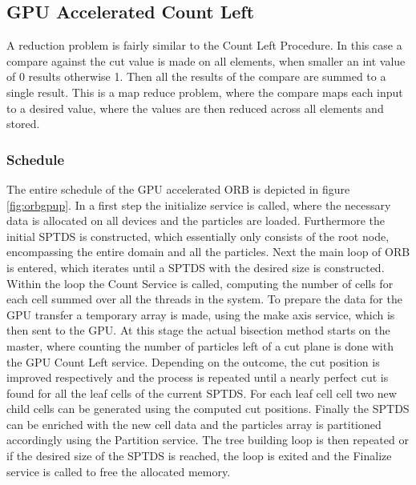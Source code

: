 \documentclass[]{article}
\begin{document}
\subsection{GPU Accelerated Count Left}

A reduction problem is fairly similar to the Count Left Procedure. In this case a compare against the cut value is made on all elements, when smaller an int value of 0 results otherwise 1. Then all the results of the compare are summed to a single result. This is a map reduce problem, where the compare maps each input to a desired value, where the values are then reduced across all elements and stored. 

\subsubsection{Schedule}

The entire schedule of the GPU accelerated ORB is depicted in figure \ref{fig:orbgpup}. In a first step the initialize service is called, where the necessary data is allocated on all devices and the particles are loaded. Furthermore the initial SPTDS is constructed, which essentially only consists of the root node, encompassing the entire domain and all the particles. Next the main loop of ORB is entered, which iterates until a SPTDS with the desired size is constructed. Within the loop the Count Service is called, computing the number of cells for each cell summed over all the threads in the system. To prepare the data for the GPU transfer a temporary array is made, using the make axis service, which is then sent to the GPU. 
At this stage the actual bisection method starts on the master, where counting the number of particles left of a cut plane is done with the GPU Count Left service. Depending on the outcome, the cut position is improved respectively and the process is repeated until a nearly perfect cut is found for all the leaf cells of the current SPTDS. For each leaf cell cell two new child cells can be generated using the computed cut positions. Finally the SPTDS can be enriched with the new cell data and the particles array is partitioned accordingly using the Partition service. 
The tree building loop is then repeated or if the desired size of the SPTDS is reached, the loop is exited and the Finalize service is called to free the allocated memory.
\end{document}
